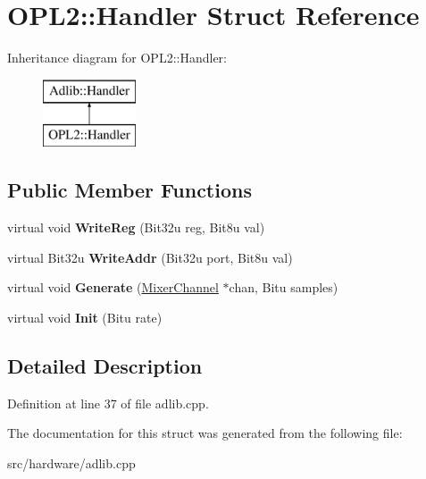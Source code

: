 \hypertarget{structOPL2_1_1Handler}{\section{O\-P\-L2\-:\-:Handler Struct Reference}
\label{structOPL2_1_1Handler}
}
Inheritance diagram for O\-P\-L2\-:\-:Handler\-:\begin{figure}[H]
\begin{center}
\leavevmode
\includegraphics[height=2.000000cm]{structOPL2_1_1Handler}
\end{center}
\end{figure}
\subsection*{Public Member Functions}
\begin{DoxyCompactItemize}
\item 
\hypertarget{structOPL2_1_1Handler_abb646d55a924a8f63f8886aa2424011c}{virtual void {\bfseries Write\-Reg} (Bit32u reg, Bit8u val)}\label{structOPL2_1_1Handler_abb646d55a924a8f63f8886aa2424011c}

\item 
\hypertarget{structOPL2_1_1Handler_a4ce8eb3de6766097896a65d6a0add8eb}{virtual Bit32u {\bfseries Write\-Addr} (Bit32u port, Bit8u val)}\label{structOPL2_1_1Handler_a4ce8eb3de6766097896a65d6a0add8eb}

\item 
\hypertarget{structOPL2_1_1Handler_a6e5217a83415a24708e245e86c27180d}{virtual void {\bfseries Generate} (\hyperlink{classMixerChannel}{Mixer\-Channel} $\ast$chan, Bitu samples)}\label{structOPL2_1_1Handler_a6e5217a83415a24708e245e86c27180d}

\item 
\hypertarget{structOPL2_1_1Handler_aaaf822d10e0b19c29aa6a2bc5ad2a9df}{virtual void {\bfseries Init} (Bitu rate)}\label{structOPL2_1_1Handler_aaaf822d10e0b19c29aa6a2bc5ad2a9df}

\end{DoxyCompactItemize}


\subsection{Detailed Description}


Definition at line 37 of file adlib.\-cpp.



The documentation for this struct was generated from the following file\-:\begin{DoxyCompactItemize}
\item 
src/hardware/adlib.\-cpp\end{DoxyCompactItemize}
